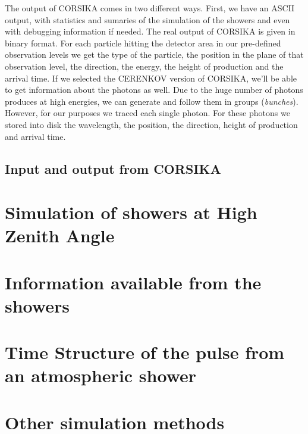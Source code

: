 The output of CORSIKA comes in two different ways. First, we have an
ASCII output, with statistics and sumaries of the simulation of the
showers and even with debugging information if needed.  The real
output of CORSIKA is given in binary format. For each particle hitting
the detector area in our pre-defined observation levels we get the
type of the particle, the position in the plane of that observation
level, the direction, the energy, the height of production and the
arrival time. If we selected the CERENKOV version of CORSIKA, we'll be
able to get information about the \Cherenkov photons as well. Due to
the huge number of \Cherenkov photons produces at high energies, we
can generate and follow them in groups (\emph{bunches}).  However, for
our purposes we traced each single \Cherenkov photon. For these
photons we stored into disk the wavelength, the position, the
direction, height of production and arrival time.

\subsection{Input and output from CORSIKA}
%

\section{Simulation of showers at High Zenith Angle}

\section{Information available from the showers}

\section{Time Structure of the \Cherenkov pulse from an atmospheric shower}

\section{Other simulation methods}
\label{sec:simothers}
\endinput
%
